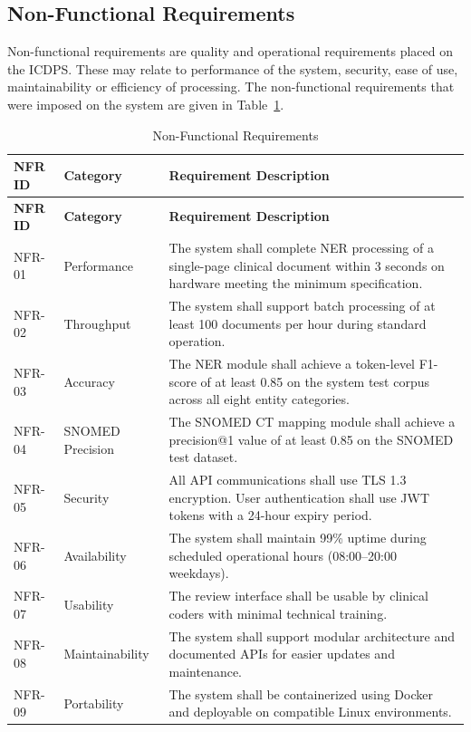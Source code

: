 \subsection{Non-Functional Requirements}

Non-functional requirements are quality and operational requirements placed on the ICDPS. These may relate to performance of the system, security, ease of use, maintainability or efficiency of processing. The non-functional requirements that were imposed on the system are given in Table~\ref{tab:nonfunctional_requirements}.

\begin{longtable}{|p{1.8cm}|p{2.6cm}|p{10cm}|}
\caption{Non-Functional Requirements}
\label{tab:nonfunctional_requirements} \\
\hline
\textbf{NFR ID} & \textbf{Category} & \textbf{Requirement Description} \\
\hline
\endfirsthead
\hline
\textbf{NFR ID} & \textbf{Category} & \textbf{Requirement Description} \\
\hline
\endhead
\hline
\endfoot
NFR-01 & Performance & The system shall complete NER processing of a single-page clinical document within 3 seconds on hardware meeting the minimum specification. \\
\hline
NFR-02 & Throughput & The system shall support batch processing of at least 100 documents per hour during standard operation. \\
\hline
NFR-03 & Accuracy & The NER module shall achieve a token-level F1-score of at least 0.85 on the system test corpus across all eight entity categories. \\
\hline
NFR-04 & SNOMED Precision & The SNOMED CT mapping module shall achieve a precision@1 value of at least 0.85 on the SNOMED test dataset. \\
\hline
NFR-05 & Security & All API communications shall use TLS 1.3 encryption. User authentication shall use JWT tokens with a 24-hour expiry period. \\
\hline
NFR-06 & Availability & The system shall maintain 99\% uptime during scheduled operational hours (08:00--20:00 weekdays). \\
\hline
NFR-07 & Usability & The review interface shall be usable by clinical coders with minimal technical training. \\
\hline
NFR-08 & Maintainability & The system shall support modular architecture and documented APIs for easier updates and maintenance. \\
\hline
NFR-09 & Portability & The system shall be containerized using Docker and deployable on compatible Linux environments. \\
\hline
\end{longtable}


